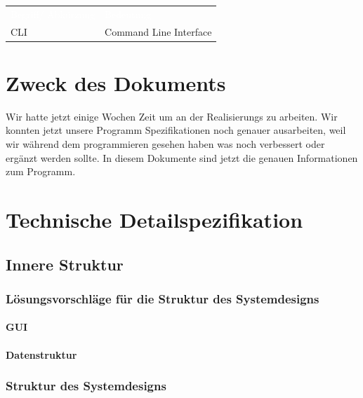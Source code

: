\documentclass[10pt,paper=a4,final]{scrartcl}
\begin{document}
\begin{tabularx}{\textwidth}{l X}
\textcolor{white}{Begriff/ Abkürzung}\cellcolor{blue!80!} & \textcolor{white}{Bedeutung}\cellcolor{blue!80!} \\
CLI \cellcolor{blue!20!} & Command Line Interface\cellcolor{blue!20!} \\
\end{tabularx}
\newline
\newline
\newline

{}
\flushleft
\newpage
\tableofcontents
\newpage
\section{Zweck des Dokuments}
Wir hatte jetzt einige Wochen Zeit um an der Realisierungs zu arbeiten. Wir konnten jetzt unsere Programm Spezifikationen noch genauer ausarbeiten, weil wir während dem programmieren gesehen haben was noch verbessert oder ergänzt werden sollte. In diesem Dokumente sind jetzt die genauen Informationen zum Programm.
\section{Technische Detailspezifikation}
\subsection{Innere Struktur}
\subsubsection{L\"osungsvorschl\"age f\"ur die Struktur des Systemdesigns}
\paragraph{GUI}
\paragraph{Datenstruktur}
\subsubsection{Struktur des Systemdesigns}
\end{document}
